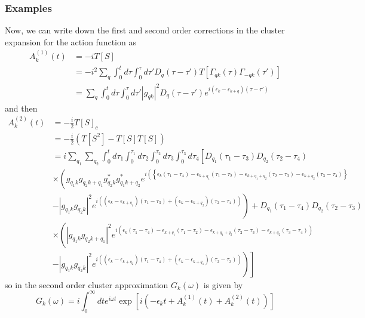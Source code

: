 \subsubsection{Examples}
Now, we can write down the first and second order corrections in the cluster expansion for the action function as
\begin{align}
    A_k^{(1)}(t) &= -i T[S] \\
&= -i^2 \sum_q \int_0^t d \tau \int_0^\tau d \tau' D_q(\tau - \tau') T\left[ \Gamma_{q k}(\tau) \Gamma_{-q k}(\tau') \right] \\
&= \sum_q \int_0^t d \tau \int_0^\tau d \tau' \left| g_{q k} \right|^2 D_q(\tau - \tau') e^{i (\epsilon_k - \epsilon_{k + q})(\tau - \tau')}
\end{align}
and then
\begin{align}
A_k^{(2)}(t) &= -\frac{i}{2}  T\left[S\right]_c\\
&= -\frac{i}{2} \left( T\left[S^2\right] - T\left[S\right] T\left[S\right] \right) \\
 &= i \sum_{q_1} \sum_{q_2} \int_0^t d \tau_1 \int_0^{\tau_1} d \tau_2 \int_0^{\tau_2} d \tau_3 \int_0^{\tau_3} d \tau_4 \left[ D_{q_1}(\tau_1 - \tau_3) D_{q_2}(\tau_2 - \tau_4) \right. \\
&\times \left( g_{q_1 k} g_{q_2 k + q_1} g_{q_2 k}^* g_{q_1 k + q_2}^* e^{i \left( \left\{ \epsilon_k (\tau_1 - \tau_4) - \epsilon_{k + q_1} (\tau_1 - \tau_2) - \epsilon_{k + q_1 + q_2} (\tau_2 - \tau_3) - \epsilon_{k + q_2} (\tau_3 - \tau_4) \right\} \right.} \right. \\
&\left. - |g_{q_1 k} g_{q_2 k}|^2 e^{i \left( (\epsilon_k - \epsilon_{k + q_1})(\tau_1 - \tau_3) + (\epsilon_k - \epsilon_{k + q_2})(\tau_2 - \tau_4) \right)} \right) + D_{q_1}(\tau_1 - \tau_4) D_{q_2}(\tau_2 - \tau_3) \\
&\times \left( |g_{q_1 k} g_{q_2 k + q_1}|^2 e^{i \left( \epsilon_k (\tau_1 - \tau_4) - \epsilon_{k + q_1} (\tau_1 - \tau_2) - \epsilon_{k + q_1 + q_2} (\tau_2 - \tau_3) - \epsilon_{k + q_2} (\tau_3 - \tau_4) \right)} \right. \\
&\left. \left. - |g_{q_1 k} g_{q_2 k}|^2 e^{i \left( (\epsilon_k - \epsilon_{k  + q_2})(\tau_1 - \tau_4) + (\epsilon_k - \epsilon_{k + q_1})(\tau_2 - \tau_3) \right)} \right) \right]
\end{align}
so in the second order cluster approximation $G_k(\omega)$ is given by
\begin{equation}
G_k(\omega )=i \int_0^{\infty} d t e^{i \omega t} \exp \left[ i \left( -\epsilon_k t + A_k^{(1)}(t) + A_k^{(2)}(t) \right) \right]
\end{equation}

